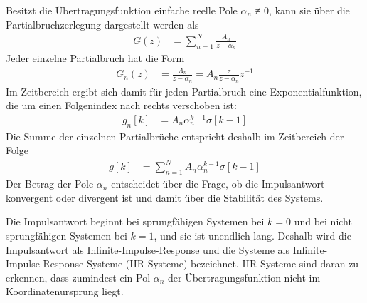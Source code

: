 Besitzt die Übertragungsfunktion einfache reelle Pole \(α_{n}\) ≠ 0, kann sie über die Partialbruchzerlegung dargestellt werden als
\begin{align}
G(z) &= \sum\limits_{n = 1}^{N}\frac{A_{n}}{z - \alpha_{n}} \label{eq:6.90}
\end{align}
Jeder einzelne Partialbruch hat die Form
\begin{align}
G_{n}(z) &= \frac{A_{n}}{z - \alpha_{n}} = A_{n}  \frac{z}{z - \alpha_{n}}  z^{- 1} \label{eq:6.91}
\end{align}
Im Zeitbereich ergibt sich damit für jeden Partialbruch eine Exponentialfunktion, die um einen Folgenindex nach rechts verschoben ist:
\begin{align}
g_{n}[ k] &= A_{n}  \alpha_{n}^{k - 1}  \sigma[ k - 1] \label{eq:6.92}
\end{align}
Die Summe der einzelnen Partialbrüche entspricht deshalb im Zeitbereich der Folge
\begin{align}
g[ k] &= \sum\limits_{n = 1}^{N}{A_{n}  \alpha_{n}^{k - 1}  \sigma[ k - 1]} \label{eq:6.93}
\end{align}
Der Betrag der Pole \(α_{n}\) entscheidet über die Frage, ob die Impulsantwort konvergent oder divergent ist und damit über die Stabilität des Systems.

Die Impulsantwort beginnt bei sprungfähigen Systemen bei \(k = 0\) und bei nicht sprungfähigen Systemen bei \(k = 1\), und sie ist unendlich lang. Deshalb wird die Impulsantwort als Infinite-Impulse-Response und die Systeme als Infinite-Impulse-Response-Systeme (IIR-Systeme) bezeichnet. IIR-Systeme sind daran zu erkennen, dass zumindest ein Pol \(α_{n}\) der Übertragungsfunktion nicht im Koordinatenursprung liegt.

